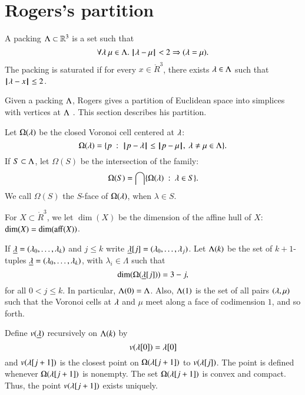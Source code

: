 \section{Rogers's partition}

\begin{definition}
A packing $\Lambda\subset \mathbb{R}^3$ is a set such that
$$\forall \lambda~\mu\in \Lambda.~  {\hskip0.1em|\hskip-0.15em|\hskip0.1em}\lambda - \mu{\hskip0.1em|\hskip-0.15em|\hskip0.1em} < 2 \Rightarrow (\lambda=\mu).$$
The packing is saturated if for every $x\in\ring{R}^3$,   there exists $\lambda\in\Lambda$
such that ${\hskip0.1em|\hskip-0.15em|\hskip0.1em}\lambda - x{\hskip0.1em|\hskip-0.15em|\hskip0.1em}\le 2$.
\end{definition}


Given a packing $\Lambda$, Rogers gives a partition of Euclidean space into
simplices with vertices at $\Lambda$ \cite{Rogers:1958:Packing}.   This section describes his partition.

Let $\Omega(\lambda)$  be the closed Voronoi cell centered at $\lambda$:
$$
  \Omega(\lambda) = \{p \ :\   {\hskip0.1em|\hskip-0.15em|\hskip0.1em}p - \lambda{\hskip0.1em|\hskip-0.15em|\hskip0.1em} 
\le {\hskip0.1em|\hskip-0.15em|\hskip0.1em}p - \mu{\hskip0.1em|\hskip-0.15em|\hskip0.1em},\ \lambda\ne\mu\in\Lambda\}.
$$
If $S\subset\Lambda$, let $\Omega(S)$ be the intersection of the family:
$$\Omega(S)  = \bigcap \{\Omega(\lambda)\ :\  \lambda\in S \}.$$
We call $\Omega(S)$ the $S$-face of $\Omega(\lambda)$, when $\lambda\in S$.

For $X\subset\ring{R}^3$, we let $\dim(X)$ be the dimension of the affine hull
of $X$: $\dim(X) = \dim({\operatorname{aff}}(X))$.

If ${\underline{\lambda}}=(\lambda_0,\ldots,\lambda_k)$ and $j\le k$ write ${\underline{\lambda}}[j] = (\lambda_0,\ldots,\lambda_j)$.
Let $\Lambda(k)$ be the set of $k+1$-tuples ${\underline{\lambda}}=(\lambda_0,\ldots,\lambda_k)$, with
$\lambda_i\in\Lambda$ such
that 
\begin{equation}\label{eqn:omega-dim}
\dim(\Omega({\underline{\lambda}}[j])) = 3-j,
\end{equation}
for all $0<j\le k$.
In particular, $\Lambda(0)=\Lambda$.  Also, $\Lambda(1)$ is the
set of all pairs $(\lambda,\mu)$ such that the Voronoi cells at $\lambda$ and $\mu$ meet along
a face of codimension $1$, and
so forth.


Define $v({\underline{\lambda}})$ recursively on $\Lambda(k)$ by
$$v(\lambda[0]) = \lambda[0]$$
and $v(\lambda[j+1])$ is the closest point on $\Omega(\lambda[j+1])$ to $v(\lambda[j])$.  The point is defined whenever $\Omega(\lambda[j+1])$ is nonempty.
The set $\Omega(\lambda[j+1])$ is convex and compact.  Thus, the point $v(\lambda[j+1])$ exists
uniquely.


